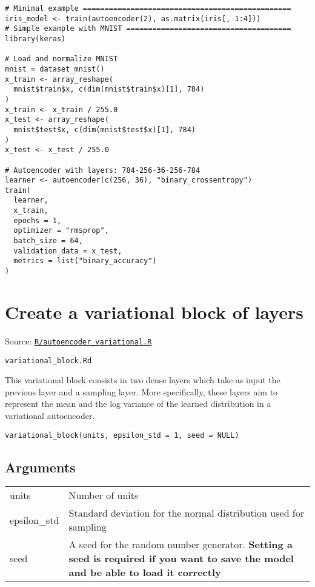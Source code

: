 \begin{verbatim}
# Minimal example ================================================
iris_model <- train(autoencoder(2), as.matrix(iris[, 1:4]))
# Simple example with MNIST ======================================
library(keras)

# Load and normalize MNIST
mnist = dataset_mnist()
x_train <- array_reshape(
  mnist$train$x, c(dim(mnist$train$x)[1], 784)
)
x_train <- x_train / 255.0
x_test <- array_reshape(
  mnist$test$x, c(dim(mnist$test$x)[1], 784)
)
x_test <- x_test / 255.0

# Autoencoder with layers: 784-256-36-256-784
learner <- autoencoder(c(256, 36), "binary_crossentropy")
train(
  learner,
  x_train,
  epochs = 1,
  optimizer = "rmsprop",
  batch_size = 64,
  validation_data = x_test,
  metrics = list("binary_accuracy")
)
\end{verbatim}

\section{Create a variational block of
layers}\label{create-a-variational-block-of-layers}

Source:
\href{https://github.com/fdavidcl/ruta/blob/master/R/autoencoder_variational.R}{\texttt{R/autoencoder\_variational.R}}

\texttt{variational\_block.Rd}

This variational block consists in two dense layers which take as input
the previous layer and a sampling layer. More specifically, these layers
aim to represent the mean and the log variance of the learned
distribution in a variational autoencoder.

\begin{verbatim}
variational_block(units, epsilon_std = 1, seed = NULL)
\end{verbatim}

\hypertarget{arguments}{\subsection{\texorpdfstring{\protect\hyperlink{arguments}{}Arguments}{Arguments}}\label{arguments}}

\begin{longtable}[c]{@{}>{\small}p{3cm}>{\raggedright}p{12.5cm}@{}}
\toprule
units & Number of units\tabularnewline
epsilon\_std & Standard deviation for the normal distribution used for
sampling\tabularnewline
seed & A seed for the random number generator. \textbf{Setting a seed is
required if you want to save the model and be able to load it
correctly}\tabularnewline
\bottomrule
\end{longtable}

